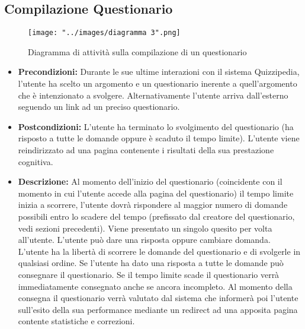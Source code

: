 \subsection{Compilazione Questionario}
\begin{figure}[h!]
\begin{center}
	\texttt{[image: "../images/diagramma 3".png]}
	\caption{Diagramma di attività sulla compilazione di un questionario}
\end{center}
\end{figure}
\begin{itemize}
\item\textbf{Precondizioni:} Durante le sue ultime interazioni con il sistema Quizzipedia, l'utente ha scelto un argomento e un questionario inerente a quell'argomento che è intenzionato a svolgere. Alternativamente l'utente arriva dall'esterno seguendo un link ad un preciso questionario.
\item\textbf{Postcondizioni:} L'utente ha terminato lo svolgimento del questionario (ha risposto a tutte le domande oppure è scaduto il tempo limite). L'utente viene reindirizzato ad una pagina contenente i risultati della sua prestazione cognitiva.
\item\textbf{Descrizione:} Al momento dell'inizio del questionario (coincidente con il momento in cui l'utente accede alla pagina del questionario) il tempo limite inizia a scorrere, l'utente dovrà rispondere al maggior numero di domande possibili entro lo scadere del tempo (prefissato dal creatore del questionario, vedi sezioni precedenti). Viene presentato un singolo quesito per volta all'utente. L'utente può dare una risposta oppure cambiare domanda. L'utente ha la libertà di scorrere le domande del questionario e di svolgerle in qualsiasi ordine. Se l'utente ha dato una risposta a tutte le domande può consegnare il questionario. Se il tempo limite scade il questionario verrà immediatamente consegnato anche se ancora incompleto. Al momento della consegna il questionario verrà valutato dal sistema che informerà poi l'utente sull'esito della sua performance mediante un redirect ad una apposita pagina contente statistiche e correzioni. %
\end{itemize}

\newpage
